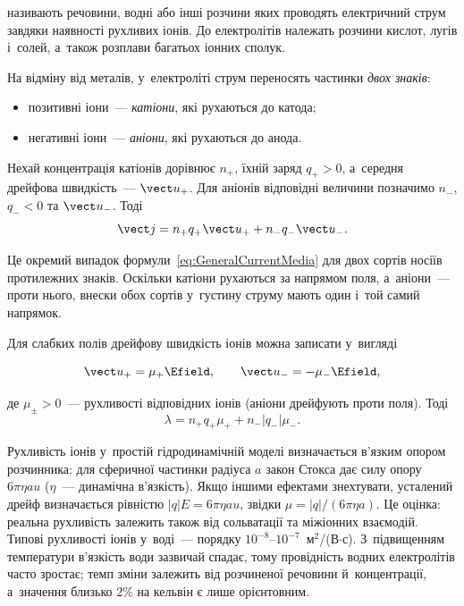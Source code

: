  називають речовини, водні або інші розчини яких проводять
електричний струм завдяки наявності рухливих іонів. До електролітів належать розчини
кислот, лугів і~солей, а~також розплави багатьох іонних сполук.

На відміну від металів, у~електроліті струм переносять частинки \emph{двох знаків}:
\begin{itemize}
	\item позитивні іони~--- \emph{катіони}, які рухаються до катода;
	\item негативні іони~--- \emph{аніони}, які рухаються до анода.
\end{itemize}

Нехай концентрація катіонів дорівнює $n_+$, їхній заряд $q_+>0$, а~середня дрейфова
швидкість~--- $\vect u_+$. Для аніонів відповідні величини позначимо $n_-$, $q_-<0$ та
$\vect u_-$. Тоді
\begin{equation}\label{eq:ElectrolyteCurrent}
	\vect j = n_+q_+\vect u_+ + n_-q_-\vect u_-.
\end{equation}

Це окремий випадок формули~\eqref{eq:GeneralCurrentMedia} для двох сортів носіїв
протилежних знаків. Оскільки катіони
рухаються за напрямом поля, а~аніони~--- проти нього, внески обох сортів у~густину струму
мають один і~той самий напрямок.

Для слабких полів дрейфову швидкість іонів можна записати у~вигляді

\begin{equation*}
	\vect u_+ = \mu_+ \Efield, \qquad \vect u_- = -\mu_- \Efield,
\end{equation*}

де $\mu_\pm>0$~--- рухливості відповідних іонів (аніони дрейфують проти поля). Тоді
\begin{equation}\label{eq:ElectrolyteConductivity}
	\lambda = n_+q_+\mu_+ + n_-|q_-|\mu_-.
\end{equation}

Рухливість іонів у~простій гідродинамічній моделі визначається в'язким опором розчинника:
для сферичної частинки радіуса $a$ закон Стокса дає силу опору $6\pi\eta a u$
($\eta$~--- динамічна в'язкість). Якщо іншими ефектами знехтувати, усталений дрейф
визначається рівністю $|q|E=6\pi\eta a u$, звідки $\mu=|q|/(6\pi\eta a)$. Це оцінка:
реальна рухливість залежить також від сольватації та міжіонних взаємодій. Типові рухливості
іонів у~воді~--- порядку $10^{-8}$--$10^{-7}$~м$^2$/(В$\cdot$с). З~підвищенням температури
в'язкість води зазвичай спадає, тому провідність водних електролітів часто зростає; темп
зміни залежить від розчиненої речовини й~концентрації, а~значення близько $2\%$ на кельвін
є лише орієнтовним.



